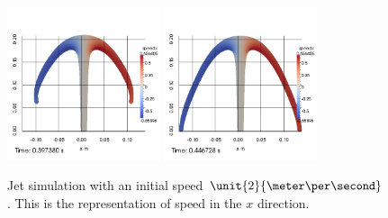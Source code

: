\begin{figure}
\begin{center}
{}
\subcaptionbox{\label{top:jet:Gx:5}}
{
\includegraphics[width=0.4\textwidth]{topology/JetGrand/speedx0005.jpg}
}
\subcaptionbox{\label{top:jet:Gx:6}}
{
\includegraphics[width=0.4\textwidth]{topology/JetGrand/speedx0006.jpg}
}
\end{center}
\caption{Jet simulation with an initial speed $\unit{2}{\meter \per \second}$.
This is the representation of speed in the $x$ direction.}
\label{top:jet:Gx}
\end{figure}

